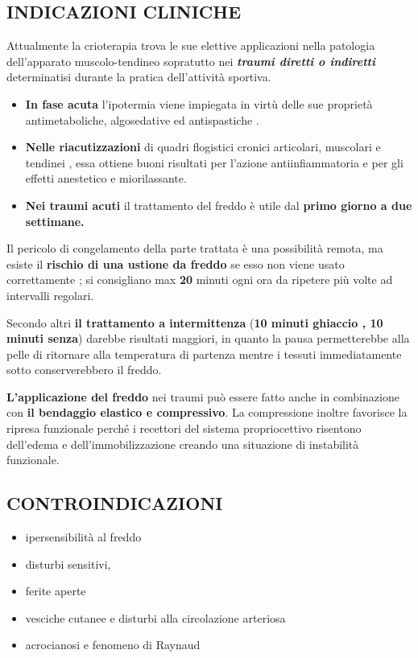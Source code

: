 \subsection{INDICAZIONI CLINICHE}

 

Attualmente la crioterapia trova le sue elettive applicazioni nella
patologia dell'apparato muscolo-tendineo sopratutto nei
\textbf{\emph{traumi diretti o indiretti}} determinatisi durante la
pratica dell'attività sportiva.
\begin{itemize}
\item 
\textbf{In fase acuta} l'ipotermia viene impiegata in virtù delle sue
proprietà antimetaboliche, algosedative ed antispastiche .
\item 
\textbf{Nelle riacutizzazioni} di quadri flogistici cronici
articolari, muscolari e tendinei , essa ottiene buoni risultati per
l'azione antiinfiammatoria e per gli effetti anestetico e miorilassante.
\item 
 
\textbf{Nei traumi acuti} il trattamento del freddo è utile dal
\textbf{primo giorno a due settimane.}
 
\end{itemize}
Il pericolo di congelamento della parte trattata è una possibilità
remota, ma esiste il \textbf{rischio di una ustione da freddo} se esso
non viene usato correttamente ; si consigliano max \textbf{20} minuti
ogni ora da ripetere più volte ad intervalli regolari.

 
Secondo altri \textbf{il trattamento a intermittenza} (\textbf{10 minuti
ghiaccio , 10 minuti senza}) darebbe risultati maggiori, in quanto la
pausa permetterebbe alla pelle di ritornare alla temperatura di partenza
mentre i tessuti immediatamente sotto conserverebbero il freddo.
 

\textbf{L'applicazione del freddo} nei traumi può essere fatto anche in
combinazione con \textbf{il bendaggio elastico e compressivo}. La
compressione inoltre favorisce la ripresa funzionale perché i recettori
del sistema propriocettivo risentono dell'edema e dell'immobilizzazione
creando una situazione di instabilità funzionale.

 
\subsection{CONTROINDICAZIONI}

 

\begin{itemize}
\item
  ipersensibilità al freddo
\item
  disturbi sensitivi,
\item
  ferite aperte
\item
  vesciche cutanee e disturbi alla circolazione arteriosa
\item
  acrocianosi e fenomeno di Raynaud
\end{itemize}
